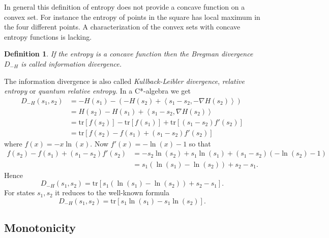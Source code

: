 \documentclass[10pt,a4paper,draft]{article}
\newtheorem{Definition}{Definition}
\begin{document}
In general this definition of entropy does not provide a concave
function on a convex set. For instance the entropy of points in the
square has local maximum in the four different points. A
characterization
of the convex sets with concave entropy functions is lacking.
\begin{Definition}
If the entropy is a concave function then the Bregman divergence
$D_{-H}$
is called \emph{information divergence}.
\end{Definition}
The information divergence is also called \emph{Kullback-Leibler
divergence},
\emph{relative entropy} or \emph{quantum relative entropy}. In a
C*-algebra we get
\begin{align*}
D_{-H}\left(s_1 ,s_2 \right) &
=-H\left(s_1 \right)-\left(-H\left(s_2 \right)+\left\langle
s_1 -s_2 ,-\nabla H\left(s_2 \right)\right\rangle \right)\\
& =H\left(s_2 \right)-H\left(s_1 \right)+\left\langle s_1 -s_2 ,\nabla
H\left(s_2 \right)\right\rangle \\
&
=\mathrm{tr}\left[f\left(s_2 \right)\right]-\mathrm{tr}\left[f\left(s_1 \right)\right]+\mathrm{tr}\left[\left(s_1 -s_2 \right)f'\left(s_2 \right)\right]\\
&
=\mathrm{tr}\left[f\left(s_2 \right)-f\left(s_1 \right)+\left(s_1 -s_2 \right)
f'\left(s_2 \right)\right]
\end{align*}
where $f\left(x\right)=-x\ln\left(x\right).$ Now
$f'\left(x\right)=-\ln\left(x\right)-1$
so that
\begin{align*}
f\left(s_2 \right)-f\left(s_1 \right)+\left(s_1 - s_2 \right)f'\left(s_2 \right)
&
=-s_2 \ln\left(s_2 \right)+s_1 \ln\left(s_1 \right)+\left(s_1 -s_2 \right)\left(-\ln\left(s_2 \right)-1\right)\\
 & =s_1 \left(\ln\left(s_1 \right)-\ln\left(s_2 \right)\right)+ s_2 -s_1.
\end{align*}
Hence 
\[
D_{-H}\left(s_1 ,s_2 \right)=\mathrm{tr}\left[s_1 \left(\ln\left(s_1 \right)-\ln\left(s_2 \right)\right)+s_2 - s_1 \right].
\]
For states $s_1, s_2$ it reduces to the well-known formula
\[
D_{-H}\left(s_1 ,s_2 \right)=\mathrm{tr}\left[s_1 \ln\left(s_1 \right)-s_1 \ln\left(s_2 \right)\right].
\]

\subsection{Monotonicity }
\end{document}
